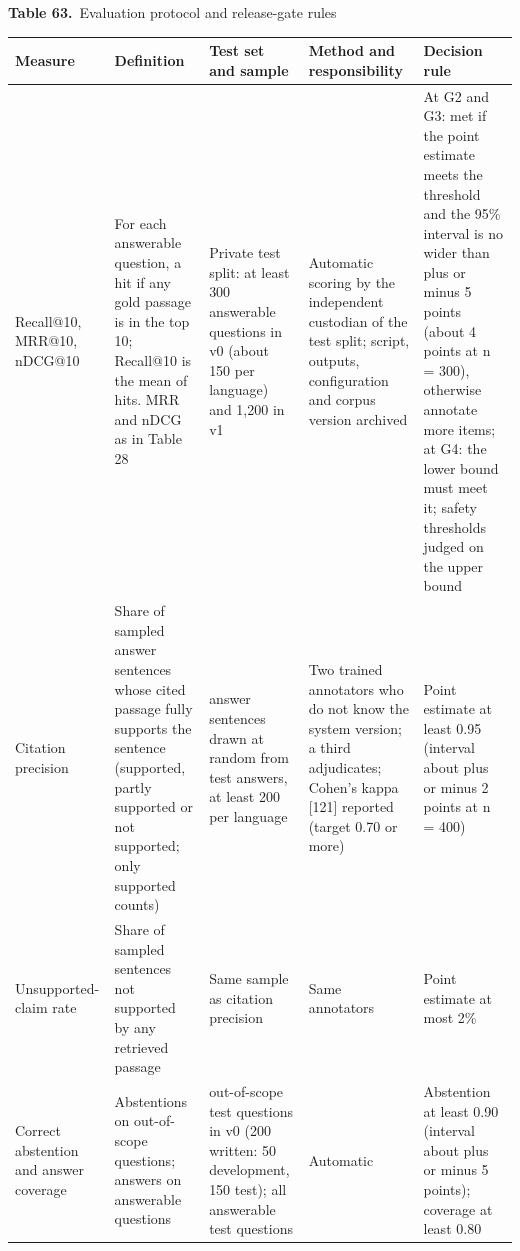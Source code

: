 \documentclass[border=10pt]{standalone}
\begin{document}
\begin{minipage}{17cm}
{\large\bfseries Table 63.}\ {\large Evaluation protocol and release-gate rules}\par\vspace{7pt}
\small
{}
\begin{tabularx}{\linewidth}{@{}>{\hsize=0.714\hsize\raggedright\arraybackslash}X>{\hsize=1.238\hsize\raggedright\arraybackslash}X>{\hsize=1.048\hsize\raggedright\arraybackslash}X>{\hsize=0.952\hsize\raggedright\arraybackslash}X>{\hsize=1.048\hsize\raggedright\arraybackslash}X@{}}
\arrayrulecolor{bapilrule}\toprule
\rowcolor{white}\textbf{Measure} & \textbf{Definition} & \textbf{Test set and sample} & \textbf{Method and responsibility} & \textbf{Decision rule} \\
\midrule
Recall@10, MRR@10, nDCG@10 & For each answerable question, a hit if any gold passage is in the top 10; Recall@10 is the mean of hits. MRR and nDCG as in Table 28 & Private test split: at least 300 answerable questions in v0 (about 150 per language) and 1,200 in v1 & Automatic scoring by the independent custodian of the test split; script, outputs, configuration and corpus version archived & At G2 and G3: met if the point estimate meets the threshold and the 95\% interval is no wider than plus or minus 5 points (about 4 points at n = 300), otherwise annotate more items; at G4: the lower bound must meet it; safety thresholds judged on the upper bound \\
Citation precision & Share of sampled answer sentences whose cited passage fully supports the sentence (supported, partly supported or not supported; only supported counts) & 400 answer sentences drawn at random from test answers, at least 200 per language & Two trained annotators who do not know the system version; a third adjudicates; Cohen’s kappa [121] reported (target 0.70 or more) & Point estimate at least 0.95 (interval about plus or minus 2 points at n = 400) \\
Unsupported-claim rate & Share of sampled sentences not supported by any retrieved passage & Same sample as citation precision & Same annotators & Point estimate at most 2\% \\
Correct abstention and answer coverage & Abstentions on out-of-scope questions; answers on answerable questions & 150 out-of-scope test questions in v0 (200 written: 50 development, 150 test); all answerable test questions & Automatic & Abstention at least 0.90 (interval about plus or minus 5 points); coverage at least 0.80 \\

\end{tabularx}
\end{minipage}
\end{document}
